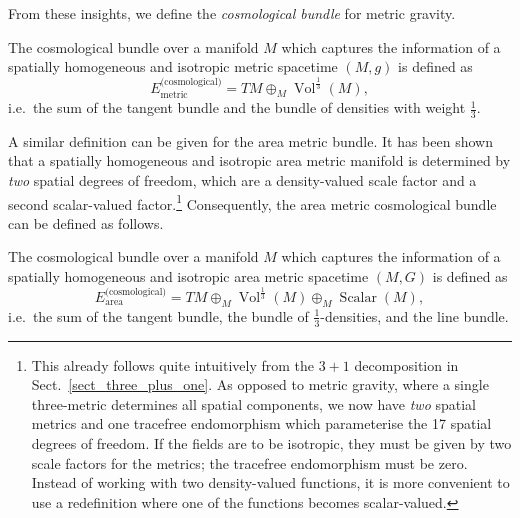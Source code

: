 From these insights, we define the \emph{cosmological bundle} for metric gravity.
\begin{definition}
  The cosmological bundle over a manifold $M$ which captures the information of a spatially homogeneous and isotropic metric spacetime $(M,g)$ is defined as
  \begin{equation}
    E_\text{metric}^\text{(cosmological)} = TM \oplus_M \operatorname{Vol}^{\frac{1}{3}}(M),
  \end{equation}
  i.e.\ the sum of the tangent bundle and the bundle of densities with weight $\frac{1}{3}$.
\end{definition}
A similar definition can be given for the area metric bundle. It has been shown \cite{Duell_2020} that a spatially homogeneous and isotropic area metric manifold is determined by \emph{two} spatial degrees of freedom, which are a density-valued scale factor and a second scalar-valued factor.\footnote{This already follows quite intuitively from the $3+1$ decomposition in Sect.~\ref{sect_three_plus_one}. As opposed to metric gravity, where a single three-metric determines all spatial components, we now have \emph{two} spatial metrics and one tracefree endomorphism which parameterise the 17 spatial degrees of freedom. If the fields are to be isotropic, they must be given by two scale factors for the metrics; the tracefree endomorphism must be zero. Instead of working with two density-valued functions, it is more convenient to use a redefinition where one of the functions becomes scalar-valued.} Consequently, the area metric cosmological bundle can be defined as follows.
\begin{definition}
  The cosmological bundle over a manifold $M$ which captures the information of a spatially homogeneous and isotropic area metric spacetime $(M,G)$ is defined as
  \begin{equation}
    E_\text{area}^\text{(cosmological)} = TM \oplus_M \operatorname{Vol}^{\frac{1}{3}}(M) \oplus_M \operatorname{Scalar}(M),
  \end{equation}
  i.e.\ the sum of the tangent bundle, the bundle of $\frac{1}{3}$-densities, and the line bundle.
\end{definition}


